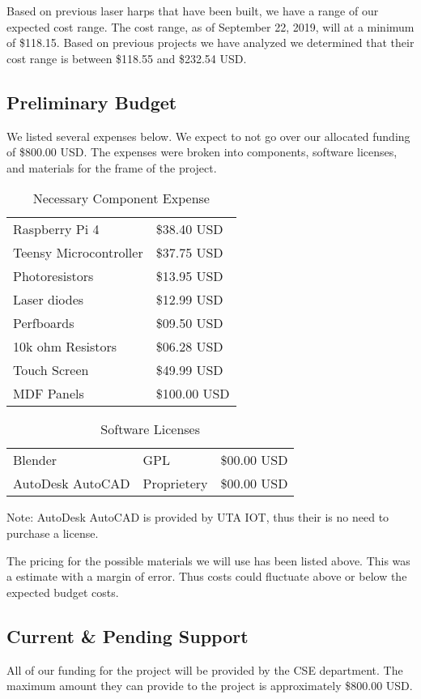 Based on previous laser harps that have been built, we have a range of our expected cost range. The cost range, as of September 22, 2019, will at a minimum of \$118.15. Based on previous projects we have analyzed we determined that their cost range is between \$118.55 and \$232.54 USD. 

\subsection{Preliminary Budget}
We listed several expenses below. We expect to not go over our allocated funding of \$800.00 USD. The expenses were broken into components, software licenses, and materials for the frame of the project.
\begin{table}[h]
\centering
\caption{Necessary Component Expense}
\begin{tabular}{ll}
Raspberry Pi 4              & \$38.40 USD \\
Teensy Microcontroller      & \$37.75 USD \\
Photoresistors              & \$13.95 USD \\
Laser diodes                & \$12.99 USD \\
Perfboards                  & \$09.50 USD \\
10k ohm Resistors           & \$06.28 USD \\
Touch Screen                & \$49.99 USD \\
MDF Panels                  & \$100.00 USD \\
\end{tabular}
\end{table}

\begin{table}[h]
\centering
\caption{Software Licenses}
\begin{tabular}{lll}
Blender             & GPL           & \$00.00 USD\\
AutoDesk AutoCAD    & Proprietery   & \$00.00 USD\\ 
\end{tabular}
\end{table}

Note: AutoDesk AutoCAD is provided by UTA IOT, thus their is no need to purchase a license.


The pricing for the possible materials we will use has been listed above. This was a estimate with a margin of error. Thus costs could fluctuate above or below the expected budget costs.

\subsection{Current \& Pending Support}
All of our funding for the project will be provided by the CSE department. The maximum amount they can provide to the project is approximately \$800.00 USD.
